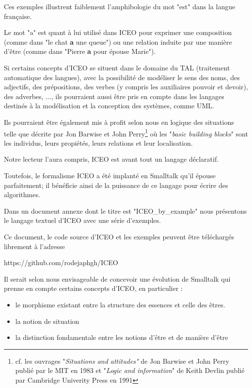 \documentclass[a4paper, 12pt, openright, french]{book}
\begin{document}
Ces exemples illustrent faiblement l'amphibologie du mot "est" dans la langue française.

Le mot "a" est quant à lui utilisé dans ICEO pour exprimer une
composition (comme dans "le chat \textbf{a} une queue") ou une relation
induite par une manière d'être (comme dans "Pierre
\textbf{a} pour épouse Marie").

Si certains concepts d'ICEO se situent dans le domaine du TAL (traitement automatique des langues), avec la possibilité de modéliser le sens des noms, des adjectifs, des prépositions, des verbes (y compris les auxiliaires pouvoir et devoir), des adverbes, ...,  ils pourraient aussi être pris en compte dans les langages destinés à la modélisation et la conception des systèmes, comme UML.

Ils pourraient être également mis à profit selon nous en logique
des situations telle que décrite par Jon Barwise et John Perry\footnote{ cf. les ouvrages "\emph{Situations and attitudes"}
	de Jon Barwise et John Perry publié par le MIT en 1983 et "\emph{Logic
		and information}" de Keith Devlin publié par Cambridge Univerity Press
	en 1991} où les
"\emph{basic building blocks}" sont les individus, leurs propiétés,
leurs relations et leur localisation.

Notre lecteur l'aura compris, ICEO est avant tout un langage déclaratif.

Toutefois, le formalisme ICEO a été implanté en Smalltalk qu'il
épouse parfaitement; il bénéficie ainsi de la puissance de ce langage pour écrire des algorithmes.

Dans un document annexe dont le titre est "ICEO\_by\_example" nous
présentons le langage textuel d'ICEO 
avec une série d'exemples.

Ce document, le code source d'ICEO et les exemples peuvent être téléchargés librement à l'adresse

https://github.com/rodejaphgh/ICEO

Il serait selon nous envisageable de concevoir une évolution de
Smalltalk qui prenne en compte certains concepts
d'ICEO, en particulier :

\begin{itemize}
\item
  le morphisme existant entre la structure des essences et celle des
  êtres.
  \item
  la notion de situation
\item
  la distinction fondamentale entre les notions d'être
  et de manière d'être
\end{itemize}
\end{document}
